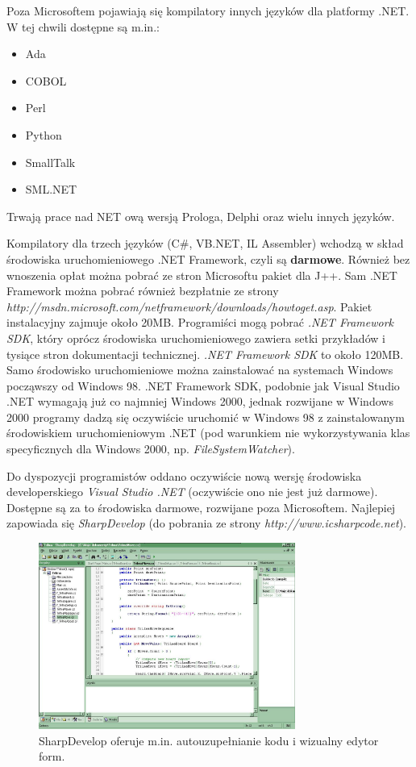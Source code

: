 Poza Microsoftem pojawiają się kompilatory innych języków dla platformy .NET. W tej chwili dostępne są
m.in.:
\begin{itemize}
	\item Ada
	\item COBOL
	\item Perl
	\item Python
	\item SmallTalk
	\item SML.NET
\end{itemize}

Trwają prace nad NET ową wersją Prologa, Delphi oraz wielu innych języków. 

Kompilatory dla trzech języków (C\#, VB.NET, IL Assembler) wchodzą w skład środowiska 
uruchomieniowego .NET Framework, czyli są {\bf darmowe}. Również bez wnoszenia opłat można pobrać ze stron 
Microsoftu pakiet dla J++. 
Sam .NET Framework można pobrać również bezpłatnie ze strony
{\em http://msdn.microsoft.com/netframework/downloads/howtoget.asp}. Pakiet instalacyjny zajmuje około
20MB. Programiści mogą pobrać {\em .NET Framework SDK}, który oprócz środowiska uruchomieniowego
zawiera setki przykładów i tysiące stron dokumentacji technicznej. {\em .NET Framework SDK} to około 120MB.
Samo środowisko uruchomieniowe można zainstalować na systemach Windows począwszy od Windows 98. .NET Framework
SDK, podobnie jak Visual Studio .NET wymagają już co najmniej Windows 2000, jednak rozwijane 
w Windows 2000 programy dadzą się oczywiście uruchomić w Windows 98 z zainstalowanym 
środowiskiem uruchomieniowym .NET (pod warunkiem
nie wykorzystywania klas specyficznych dla Windows 2000, np. {\em FileSystemWatcher}).

Do dyspozycji programistów oddano oczywiście nową wersję środowiska developerskiego {\em Visual Studio .NET}
(oczywiście ono nie jest już darmowe). Dostępne są za to środowiska darmowe, 
rozwijane poza Microsoftem. Najlepiej zapowiada się
{\em SharpDevelop} (do pobrania ze strony {\em http://www.icsharpcode.net}).

\begin{figure}
\begin{center}
\includegraphics[width=0.75\textwidth]{./pic/w00}
\caption{SharpDevelop oferuje m.in. autouzupełnianie kodu i wizualny edytor form.}
\end{center}
\end{figure}

